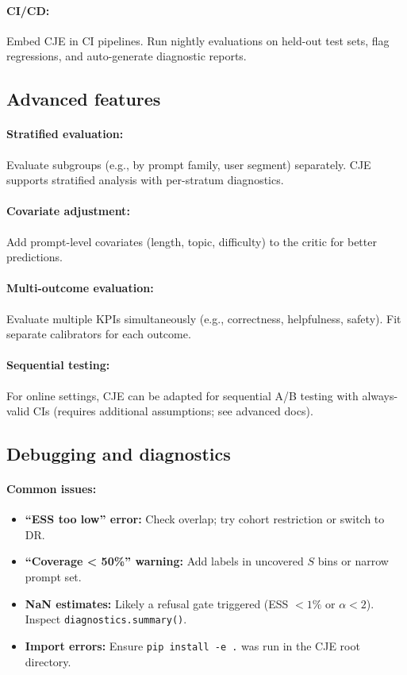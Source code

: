\paragraph{CI/CD:} Embed CJE in CI pipelines. Run nightly evaluations on held-out test sets, flag regressions, and auto-generate diagnostic reports.

\subsection{Advanced features}

\paragraph{Stratified evaluation:} Evaluate subgroups (e.g., by prompt family, user segment) separately. CJE supports stratified analysis with per-stratum diagnostics.

\paragraph{Covariate adjustment:} Add prompt-level covariates (length, topic, difficulty) to the critic for better predictions.

\paragraph{Multi-outcome evaluation:} Evaluate multiple KPIs simultaneously (e.g., correctness, helpfulness, safety). Fit separate calibrators for each outcome.

\paragraph{Sequential testing:} For online settings, CJE can be adapted for sequential A/B testing with always-valid CIs (requires additional assumptions; see advanced docs).

\subsection{Debugging and diagnostics}

\paragraph{Common issues:}
\begin{itemize}
\item \textbf{``ESS too low'' error:} Check overlap; try cohort restriction or switch to DR.
\item \textbf{``Coverage < 50\%'' warning:} Add labels in uncovered $S$ bins or narrow prompt set.
\item \textbf{NaN estimates:} Likely a refusal gate triggered (ESS $< 1\%$ or $\alpha < 2$). Inspect \texttt{diagnostics.summary()}.
\item \textbf{Import errors:} Ensure \texttt{pip install -e .} was run in the CJE root directory.
\end{itemize}

